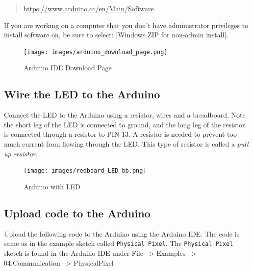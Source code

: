 \documentclass{book}
\begin{document}
\begin{quote}
\url{https://www.arduino.cc/en/Main/Software}
\end{quote}

If you are working on a computer that you don't have administrator
privileges to install software on, be sure to select: {[}Windows ZIP for
non-admin install{]}.

\begin{figure}
\centering
\texttt{[image: images/arduino\_download\_page.png]}
\caption{Arduino IDE Download Page}
\end{figure}
    




    
        \subsection{Wire the LED to the
Arduino}\label{wire-the-led-to-the-arduino}
    




    
        Connect the LED to the Arduino using a resistor, wires and a breadboard.
Note the short leg of the LED is connected to ground, and the long leg
of the resistor is connected through a resistor to PIN 13. A resistor is
needed to prevent too much current from flowing through the LED. This
type of resistor is called a \emph{pull up resistor}.
    




    
        \begin{figure}
\centering
\texttt{[image: images/redboard\_LED\_bb.png]}
\caption{Arduino with LED}
\end{figure}
    




    
        \subsection{Upload code to the
Arduino}\label{upload-code-to-the-arduino}
    




    
        Upload the following code to the Arduino using the Arduino IDE. The code
is same as in the example sketch called \lstinline!Physical Pixel!. The
\lstinline!Physical Pixel! sketch is found in the Arduino IDE under File
--\textgreater{} Examples --\textgreater{} 04.Communication
--\textgreater{} PhysicalPixel
\end{document}
